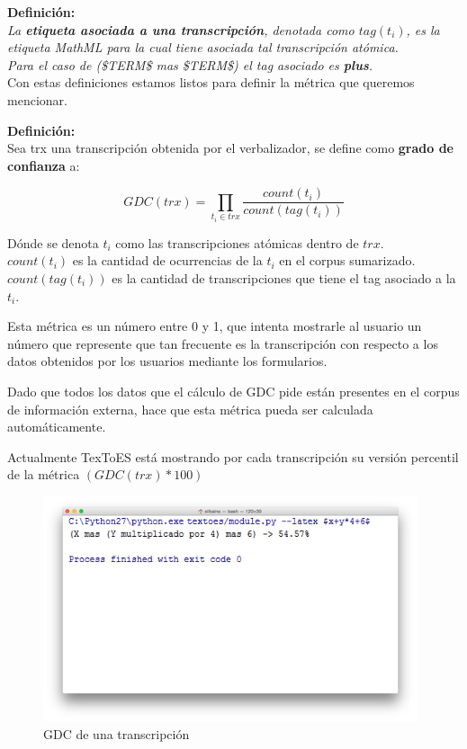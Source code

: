 \textbf{Definición:}\\\textit{La \textbf{etiqueta asociada a una transcripción}, denotada como $tag(t_i)$, es la etiqueta MathML para la cual tiene asociada tal transcripción atómica.\\Para el caso de (\$TERM\$ mas \$TERM\$) el tag asociado es \textbf{plus}.}\\

Con estas definiciones estamos listos para definir la métrica que queremos mencionar.

\textbf{Definición:}\\Sea trx una transcripción obtenida por el verbalizador, se define como \textbf{grado de confianza} a:

$$GDC(trx) = \prod_{t_i \in trx} \frac{count(t_i)}{count(tag(t_i))}$$

Dónde se denota $t_i$ como las transcripciones atómicas dentro de $trx$.\\
$count(t_i)$ es la cantidad de ocurrencias de la $t_i$ en el corpus sumarizado.\\
$count(tag(t_i))$ es la cantidad de transcripciones que tiene el tag asociado a la $t_i$.

Esta métrica es un número entre 0 y 1, que intenta mostrarle al usuario un número que represente que tan frecuente es la transcripción con respecto a los datos obtenidos por los usuarios mediante los formularios.

Dado que todos los datos que el cálculo de GDC pide están presentes en el corpus de información externa, hace que esta métrica pueda ser calculada automáticamente.

Actualmente TexToES está mostrando por cada transcripción su versión percentil de la métrica $(GDC(trx) * 100)$

\begin{figure}[H]
\centering
  \includegraphics[width=11cm, height=6.62cm]{Figures/demo_1}
  \caption[]{GDC de una transcripción}
\label{fig:demo_1}
\end{figure}

